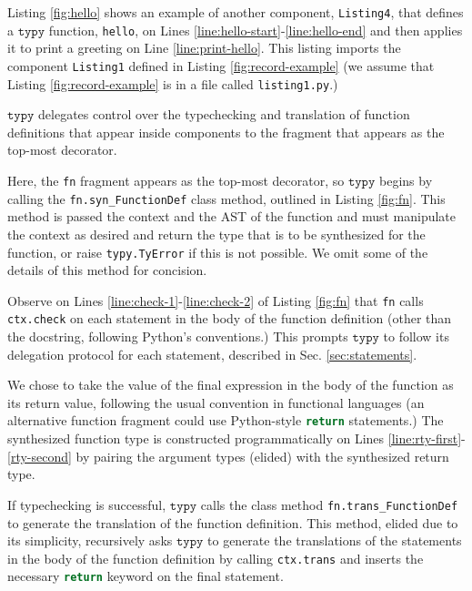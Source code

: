 \documentclass[preprint,10pt]{sigplanconf}
\newcommand{\typy}{\texttt{typy}}
\newcommand{\lip}[1]{\lstinline[language=Python,basicstyle=\ttfamily\footnotesize,deletendkeywords={tuple,buffer,map}]{#1}}
\newcommand{\li}[1]{\lip{#1}}
\begin{document}
Listing \ref{fig:hello} shows an example of another component, \li{Listing4}, that defines a $\typy$ function, \li{hello}, on Lines \ref{line:hello-start}-\ref{line:hello-end} and then applies it to print a greeting on Line \ref{line:print-hello}. This listing imports the component \li{Listing1} defined in Listing \ref{fig:record-example} (we assume that Listing \ref{fig:record-example} is in a file called \li{listing1.py}.)

$\typy$ delegates control over the typechecking and translation of function definitions that appear inside components to the fragment that appears as the top-most decorator. 

Here, the \li{fn} fragment appears as the top-most decorator, so $\typy$ begins by calling the \li{fn.syn_FunctionDef} class method, outlined in Listing \ref{fig:fn}. This method is passed the context and the AST of the function and must manipulate the context as desired and return the type that is to be synthesized for the function, or raise \li{typy.TyError} if this is not possible. We omit some of the details of this method for concision. 

Observe on Lines \ref{line:check-1}-\ref{line:check-2} of Listing \ref{fig:fn} that \li{fn} calls \li{ctx.check} on each statement in the body of the function definition (other than the docstring, following Python's conventions.) This prompts $\typy$ to follow its delegation protocol for each statement, described in Sec. \ref{sec:statements}. 

We chose to take the value of the final expression in the body of the function as its return value, following the usual convention in functional languages (an alternative function fragment could use Python-style \li{return} statements.) The synthesized function type is constructed programmatically on Lines \ref{line:rty-first}-\ref{rty-second} by pairing the argument types (elided) with the synthesized return type.

If typechecking is successful, $\typy$ calls the class method \li{fn.trans_FunctionDef} to generate the translation of the function definition. This method, elided due to its simplicity, recursively asks $\typy$ to generate the translations of the statements in the body of the function definition by calling \li{ctx.trans} and inserts the necessary \li{return} keyword on the final statement.
\end{document}
